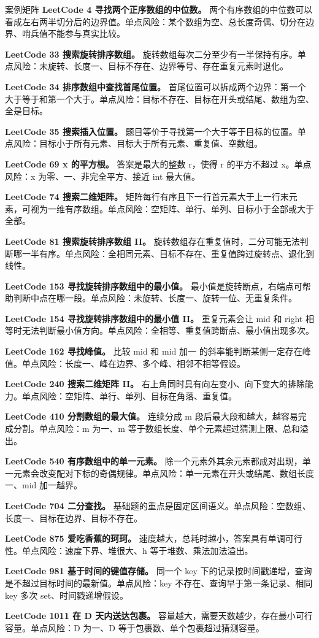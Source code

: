 \begin{principlebox}{案例矩阵}
\textbf{LeetCode 4 寻找两个正序数组的中位数。}
两个有序数组的中位数可以看成左右两半切分后的边界值。单点风险：某个数组为空、总长度奇偶、切分在边界、哨兵值不能参与真实比较。

\textbf{LeetCode 33 搜索旋转排序数组。}
旋转数组每次二分至少有一半保持有序。单点风险：未旋转、长度一、目标不存在、边界等号、存在重复元素时退化。

\textbf{LeetCode 34 排序数组中查找首尾位置。}
首尾位置可以拆成两个边界：第一个大于等于和第一个大于。单点风险：目标不存在、目标在开头或结尾、数组为空、全是目标。

\textbf{LeetCode 35 搜索插入位置。}
题目等价于寻找第一个大于等于目标的位置。单点风险：目标小于所有元素、目标大于所有元素、重复值、空数组。

\textbf{LeetCode 69 x 的平方根。}
答案是最大的整数 r，使得 r 的平方不超过 x。单点风险：x 为零、一、非完全平方、接近 int 最大值。

\textbf{LeetCode 74 搜索二维矩阵。}
矩阵每行有序且下一行首元素大于上一行末元素，可视为一维有序数组。单点风险：空矩阵、单行、单列、目标小于全部或大于全部。

\textbf{LeetCode 81 搜索旋转排序数组 II。}
旋转数组存在重复值时，二分可能无法判断哪一半有序。单点风险：全相同元素、目标不存在、重复值跨过旋转点、退化到线性。

\textbf{LeetCode 153 寻找旋转排序数组中的最小值。}
最小值是旋转断点，右端点可帮助判断中点在哪一段。单点风险：未旋转、长度一、旋转一位、无重复条件。

\textbf{LeetCode 154 寻找旋转排序数组中的最小值 II。}
重复元素会让 mid 和 right 相等时无法判断最小值方向。单点风险：全相等、重复值跨断点、最小值出现多次。

\textbf{LeetCode 162 寻找峰值。}
比较 mid 和 mid 加一 的斜率能判断某侧一定存在峰值。单点风险：长度一、峰在边界、多个峰、相邻不相等假设。

\textbf{LeetCode 240 搜索二维矩阵 II。}
右上角同时具有向左变小、向下变大的排除能力。单点风险：空矩阵、单行、单列、目标在角落、重复值。

\textbf{LeetCode 410 分割数组的最大值。}
连续分成 m 段后最大段和越大，越容易完成分割。单点风险：m 为一、m 等于数组长度、单个元素超过猜测上限、总和溢出。

\textbf{LeetCode 540 有序数组中的单一元素。}
除一个元素外其余元素都成对出现，单一元素会改变配对下标的奇偶规律。单点风险：单一元素在开头或结尾、数组长度一、mid 加一越界。

\textbf{LeetCode 704 二分查找。}
基础题的重点是固定区间语义。单点风险：空数组、长度一、目标在边界、目标不存在。

\textbf{LeetCode 875 爱吃香蕉的珂珂。}
速度越大，总耗时越小，答案具有单调可行性。单点风险：速度下界、堆很大、h 等于堆数、乘法加法溢出。

\textbf{LeetCode 981 基于时间的键值存储。}
同一个 key 下的记录按时间戳递增，查询是不超过目标时间的最新值。单点风险：key 不存在、查询早于第一条记录、相同 key 多次 set、时间戳递增假设。

\textbf{LeetCode 1011 在 D 天内送达包裹。}
容量越大，需要天数越少，存在最小可行容量。单点风险：D 为一、D 等于包裹数、单个包裹超过猜测容量。

\end{principlebox}

